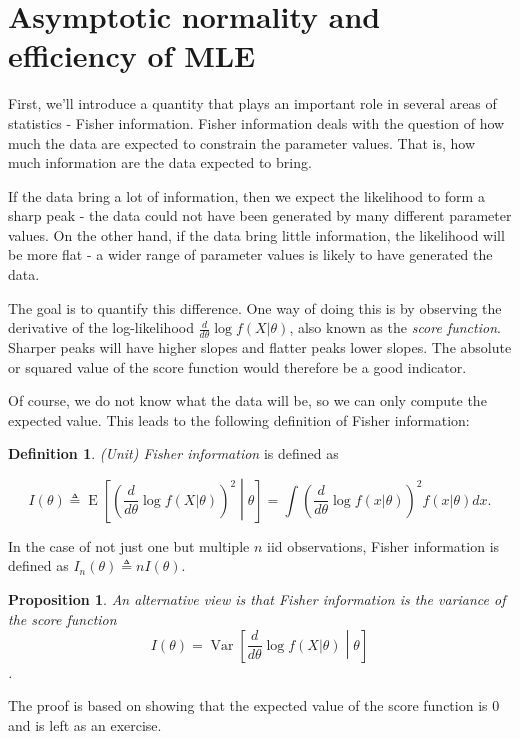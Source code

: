 \documentclass{book}
\theoremstyle{plain}%
\newtheorem{proposition}{Proposition}[section]
\theoremstyle{definition}
\newtheorem{definition}{Definition}[section]
\DeclareMathOperator{\Var}{Var}
\DeclareMathOperator{\E}{E}
\begin{document}
\section{Asymptotic normality and efficiency of MLE}\label{sec:optimality}

First, we'll introduce a quantity that plays an important role in several areas of statistics - Fisher information. Fisher information deals with the question of how much the data are expected to constrain the parameter values. That is, how much information are the data expected to bring.

If the data bring a lot of information, then we expect the likelihood to form a sharp peak - the data could not have been generated by many different parameter values. On the other hand, if the data bring little information, the likelihood will be more flat - a wider range of parameter values is likely to have generated the data.

The goal is to quantify this difference. One way of doing this is by observing the derivative of the log-likelihood $\frac{d}{d\theta} \log f(X|\theta)$, also known as the \emph{score function}. Sharper peaks will have higher slopes and flatter peaks lower slopes. The absolute or squared value of the score function would therefore be a good indicator. 

Of course, we do not know what the data will be, so we can only compute the expected value. This leads to the following definition of Fisher information:

\begin{definition} \emph{(Unit) Fisher information} is defined as 

$$I(\theta) \triangleq \E\left[\left(\frac{d}{d \theta} \log f(X|\theta)\right)^2  \middle| \theta\right] = \int \left(\frac{d}{d \theta} \log f(x|\theta)\right)^2 f(x|\theta)dx.$$

In the case of not just one but multiple $n$ iid observations, Fisher information is defined as $I_n(\theta) \triangleq nI(\theta)$.
\end{definition}

\begin{proposition} An alternative view is that Fisher information is the variance of the score function
$$I(\theta) = \Var\left[\frac{d}{d\theta} \log f(X|\theta)\middle|\theta\right]$$.
\label{prop:zeromean}
\end{proposition}

The proof is based on showing that the expected value of the score function is 0 and is left as an exercise.
\end{document}
